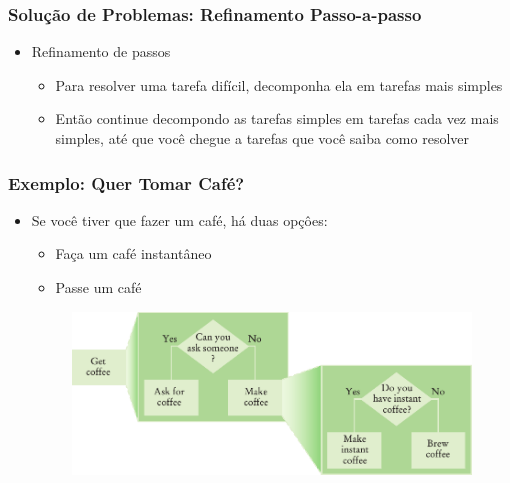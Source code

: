 \documentclass[xcolor={dvipsnames,table},aspectratio=169]{beamer}
\begin{document}
\begin{frame}\frametitle{Solução de Problemas: Refinamento Passo-a-passo}
\begin{itemize}
	\item Refinamento de passos
	\begin{itemize}
		\item Para resolver uma tarefa difícil, decomponha ela em tarefas mais simples
		\item Então continue decompondo as tarefas simples em tarefas cada vez mais simples, até que você chegue a tarefas que você saiba como resolver
	\end{itemize}
\end{itemize}
\end{frame}

\begin{frame}\frametitle{Exemplo: Quer Tomar Café?}
\begin{itemize}
	\item Se você tiver que fazer um café, há duas opçôes:
	\begin{itemize}
		\item Faça um café instantâneo
		\item Passe um café
	\end{itemize}
\begin{figure}[h]
	\includegraphics[height=0.50\paperheight,center]{pucrs-ep-fprog-unidade_05-metodos-laminas-get_coffe_1.png}
\end{figure}
\end{itemize}
\end{frame}
\end{document}

